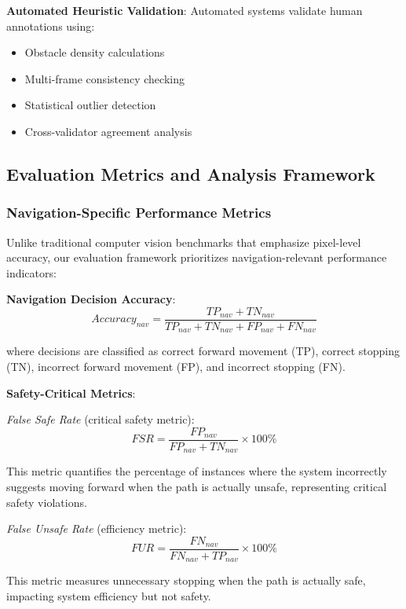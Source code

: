 \documentclass[12pt,oneside]{book}
\begin{document}
\textbf{Automated Heuristic Validation}:
Automated systems validate human annotations using:
\begin{itemize}
\item Obstacle density calculations
\item Multi-frame consistency checking
\item Statistical outlier detection
\item Cross-validator agreement analysis
\end{itemize}

\subsection{Evaluation Metrics and Analysis Framework}

\subsubsection{Navigation-Specific Performance Metrics}

Unlike traditional computer vision benchmarks that emphasize pixel-level accuracy, our evaluation framework prioritizes navigation-relevant performance indicators:

\textbf{Navigation Decision Accuracy}:
\begin{equation}
Accuracy_{nav} = \frac{TP_{nav} + TN_{nav}}{TP_{nav} + TN_{nav} + FP_{nav} + FN_{nav}}
\end{equation}

where decisions are classified as correct forward movement (TP), correct stopping (TN), incorrect forward movement (FP), and incorrect stopping (FN).

\textbf{Safety-Critical Metrics}:

\textit{False Safe Rate} (critical safety metric):
\begin{equation}
FSR = \frac{FP_{nav}}{FP_{nav} + TN_{nav}} \times 100\%
\end{equation}

This metric quantifies the percentage of instances where the system incorrectly suggests moving forward when the path is actually unsafe, representing critical safety violations.

\textit{False Unsafe Rate} (efficiency metric):
\begin{equation}
FUR = \frac{FN_{nav}}{FN_{nav} + TP_{nav}} \times 100\%
\end{equation}

This metric measures unnecessary stopping when the path is actually safe, impacting system efficiency but not safety.
\end{document}
